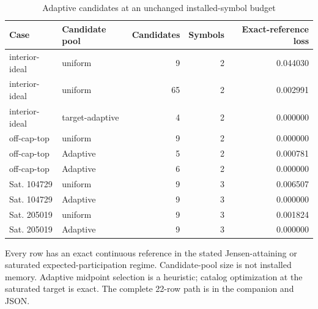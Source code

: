 \begin{table}[p]\centering\small
\caption{Adaptive candidates at an unchanged installed-symbol budget}\label{tab:r45-continuous}
\begin{tabular}{llrrr}\toprule
Case & Candidate pool & Candidates & Symbols & Exact-reference loss \\
\midrule
interior-ideal & uniform & 9 & 2 & 0.044030 \\
interior-ideal & uniform & 65 & 2 & 0.002991 \\
interior-ideal & target-adaptive & 4 & 2 & 0.000000 \\
off-cap-top & uniform & 9 & 2 & 0.000000 \\
off-cap-top & Adaptive & 5 & 2 & 0.000781 \\
off-cap-top & Adaptive & 6 & 2 & 0.000000 \\
Sat. 104729 & uniform & 9 & 3 & 0.006507 \\
Sat. 104729 & Adaptive & 9 & 3 & 0.000000 \\
Sat. 205019 & uniform & 9 & 3 & 0.001824 \\
Sat. 205019 & Adaptive & 9 & 3 & 0.000000 \\
\bottomrule\end{tabular}
\par\smallskip\begin{minipage}{.98\textwidth}\footnotesize Every row has an exact continuous reference in the stated Jensen-attaining or saturated expected-participation regime. Candidate-pool size is not installed memory. Adaptive midpoint selection is a heuristic; catalog optimization at the saturated target is exact. The complete 22-row path is in the companion and JSON.\end{minipage}
\end{table}
